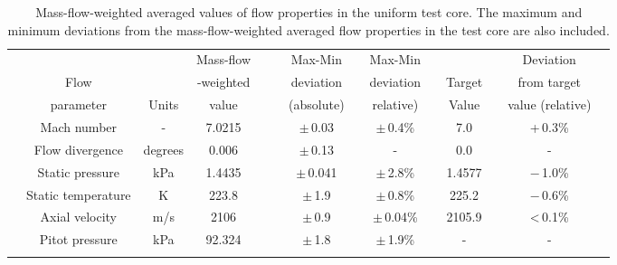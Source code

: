 \documentclass[12pt,a4paper]{article}
\begin{document}
\begin{table}[htbp]
 \begin{small}
  \begin{center}
  \caption{Mass-flow-weighted averaged values of flow properties in the 
           uniform test core. The maximum and minimum deviations from the 
           mass-flow-weighted averaged flow properties in the test core 
           are also included.}
  \label{t:nozzle-exit-flow-stats}
  \vspace{2mm}
  \begin{tabular}{@{}c@{}@{}c@{}@{}c@{}@{}c@{}@{}c@{}|@{}c@{}@{}c@{}@{}c@{}@{}c@{}@{}c@{}@{}c@{}@{}c@{}@{}c@{}@{}c@{}}
  \hline\hline\noalign{\smallskip}
  \hspace{4mm} &           &        &  Mass-flow & \hspace{3mm} & \hspace{3mm} & Max-Min    & \hspace{3mm} & Max-Min   & \hspace{4mm} &        & \hspace{4mm} & Deviation        & \hspace{4mm} \\
               & Flow      &        &  -weighted &              &              & deviation  &              & deviation &              & Target &              & from target      &              \\  
               & parameter &  Units &  value     &              &              & (absolute) &              & relative) &              & Value  &              & value (relative) &              \\
  \noalign{\smallskip}\hline\noalign{\smallskip}
               & Mach number      &    -      &  7.0215   &&& $\pm$\,0.03  &&  $\pm$\,0.4\%  &&  7.0    && +\,0.3\%          &    \\
               & Flow divergence  &  degrees  &  0.006    &&& $\pm$\,0.13  &&  -             &&  0.0    && -                 &    \\
               & Static pressure  &    kPa    &  1.4435   &&& $\pm$\,0.041 &&  $\pm$\,2.8\%  &&  1.4577 && $-$\,1.0\%        &    \\  
               & Static temperature &    K    &  223.8    &&& $\pm$\,1.9   &&  $\pm$\,0.8\%  &&  225.2  && $-$\,0.6\%        &    \\ 
               & Axial velocity   &    m/s    &  2106     &&& $\pm$\,0.9   &&  $\pm$\,0.04\% &&  2105.9 && \textless\,0.1\%  &    \\ 
               & Pitot pressure   &    kPa    &  92.324   &&& $\pm$\,1.8   &&  $\pm$\,1.9\%  &&  -      &&  -                &    \\  
  \noalign{\smallskip}\hline\hline
  \end{tabular}
  \end{center}
 \end{small}
\end{table}
%
\end{document}
